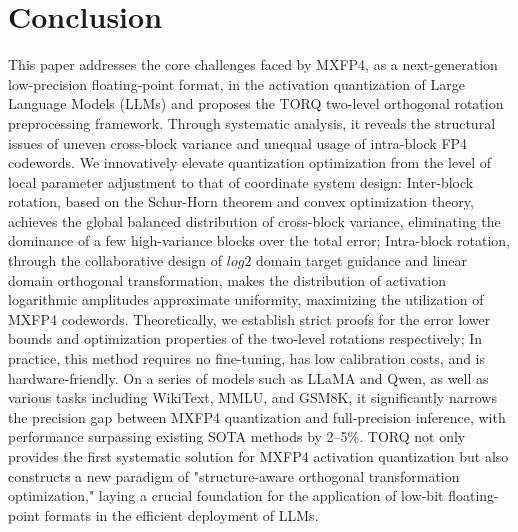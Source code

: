 \section{Conclusion}
This paper addresses the core challenges faced by MXFP4, as a next-generation low-precision floating-point format, in the activation quantization of Large Language Models (LLMs) and proposes the TORQ two-level orthogonal rotation preprocessing framework. Through systematic analysis, it reveals the structural issues of uneven cross-block variance and unequal usage of intra-block FP4 codewords. We innovatively elevate quantization optimization from the level of local parameter adjustment to that of coordinate system design: Inter-block rotation, based on the Schur-Horn theorem and convex optimization theory, achieves the global balanced distribution of cross-block variance, eliminating the dominance of a few high-variance blocks over the total error; Intra-block rotation, through the collaborative design of $log2$ domain target guidance and linear domain orthogonal transformation, makes the distribution of activation logarithmic amplitudes approximate uniformity, maximizing the utilization of MXFP4 codewords. Theoretically, we establish strict proofs for the error lower bounds and optimization properties of the two-level rotations respectively; In practice, this method requires no fine-tuning, has low calibration costs, and is hardware-friendly. On a series of models such as LLaMA and Qwen, as well as various tasks including WikiText, MMLU, and GSM8K, it significantly narrows the precision gap between MXFP4 quantization and full-precision inference, with performance surpassing existing SOTA methods by 2–5\%. TORQ not only provides the first systematic solution for MXFP4 activation quantization but also constructs a new paradigm of "structure-aware orthogonal transformation optimization," laying a crucial foundation for the application of low-bit floating-point formats in the efficient deployment of LLMs.
